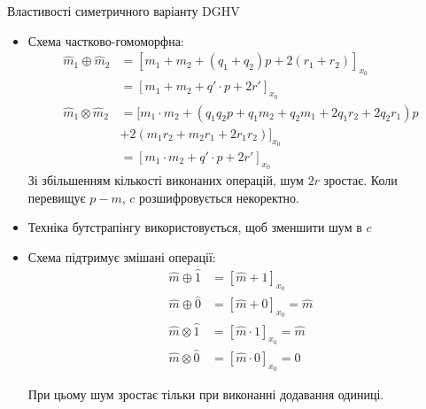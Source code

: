 \documentclass[pdf]{beamer}
\begin{document}
\begin{frame}[allowframebreaks]{Властивості симетричного варіанту DGHV}

\begin{itemize}
	\item Схема частково-гомоморфна:
	\begin{align*}
	\hat m_1 \oplus \hat m_2 &= [m_1 + m_2 + (q_1 + q_2)p + 2(r_1 + r_2)]_{x_0} \\
		&= [m_1 + m_2 + q' \cdot p + 2r']_{x_0} \\
	\hat m_1 \otimes \hat m_2 &= [m_1 \cdot m_2 + (q_1 q_2 p + q_1 m_2 + q_2 m_1 + 2 q_1 r_2 + 2 q_2 r_1)p \\
	    &+ 2(m_1 r_2 + m_2 r_1 + 2 r_1 r_2)]_{x_0} \\
	    &= [m_1 \cdot m_2 + q' \cdot p + 2r']_{x_0}
	\end{align*}
	Зі збільшенням кількості виконаних операцій, шум \( 2r \) зростає.
	Коли перевищує \(p - m\), \(c\) розшифровується некоректно.
	\item Техніка бутстрапінгу використовується, щоб зменшити шум в \(c\) \cite{DGHV10, Gen09}
	\item Схема підтримує змішані операції:
	\begin{align*}
	\hat m \oplus \hat 1 &= [\hat m + 1]_{x_0} \\
	\hat m \oplus \hat 0 &= [\hat m + 0]_{x_0} = \hat m \\
	\hat m \otimes \hat 1 &= [\hat m \cdot 1]_{x_0} = \hat m \\
	\hat m \otimes \hat 0 &= [\hat m \cdot 0]_{x_0} = 0
	\end{align*}
	
	При цьому шум зростає тільки при виконанні додавання одиниці.
\end{itemize}

\end{frame}
\end{document}
